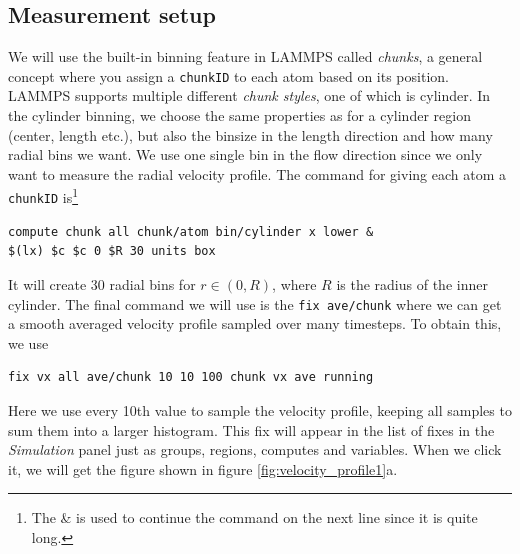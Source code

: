 \documentclass[12pt,a4paper,final]{iopart}
\newcommand{\code}[1]{\colorbox{light-gray}{\color{RawSienna}\texttt{#1}}}
\begin{document}
\subsection{Measurement setup}
We will use the built-in binning feature in LAMMPS called \textit{chunks}, a general concept where you assign a \code{chunkID} to each atom
based on its position. LAMMPS supports multiple different \textit{chunk styles}, one of which is cylinder.
In the cylinder binning, we choose the same properties as for a cylinder region (center, length etc.), but also the binsize in the length direction and how many radial bins we want.
We use one single bin in the flow direction since we only want to measure the radial velocity profile.
The command for giving each atom a \code{chunkID} is\footnote{The \& is used to continue the command on the next line since it is quite long.}
\begin{lstlisting}
compute chunk all chunk/atom bin/cylinder x lower &
$(lx) $c $c 0 $R 30 units box
\end{lstlisting}
It will create 30 radial bins for $r\in (0, R)$, where $R$ is the radius of the inner cylinder.
The final command we will use is the \code{fix ave/chunk} where we can get a smooth averaged velocity profile sampled over many timesteps.
To obtain this, we use
\begin{lstlisting}
fix vx all ave/chunk 10 10 100 chunk vx ave running
\end{lstlisting}
Here we use every 10th value to sample the velocity profile, keeping all samples to sum them into a larger histogram.
This fix will appear in the list of fixes in the \textit{Simulation} panel just as groups, regions, computes and variables.
When we click it, we will get the figure shown in figure \ref{fig:velocity_profile1}a.
\end{document}

